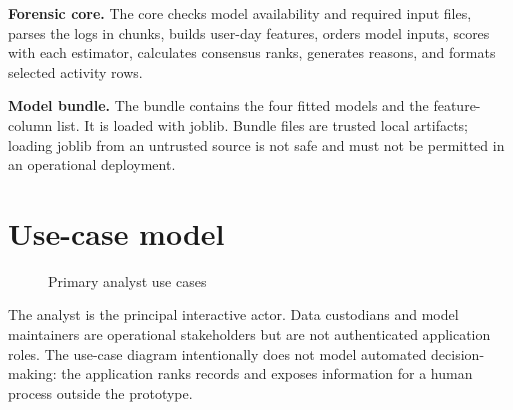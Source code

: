 \documentclass[12pt,a4paper,oneside]{report}
\begin{document}
\textbf{Forensic core.} The core checks model availability and required
input files, parses the logs in chunks, builds user-day features,
orders model inputs, scores with each estimator, calculates consensus
ranks, generates reasons, and formats selected activity rows.

\textbf{Model bundle.} The bundle contains the four fitted models and
the feature-column list. It is loaded with joblib. Bundle files are
trusted local artifacts; loading joblib from an untrusted source is
not safe and must not be permitted in an operational deployment.

\section{Use-case model}
\begin{figure}[H]
\centering
{}
\caption{Primary analyst use cases}
\label{fig:use-case}
\end{figure}

The analyst is the principal interactive actor. Data custodians and
model maintainers are operational stakeholders but are not
authenticated application roles. The use-case diagram intentionally
does not model automated decision-making: the application ranks
records and exposes information for a human process outside the
prototype.
\end{document}
